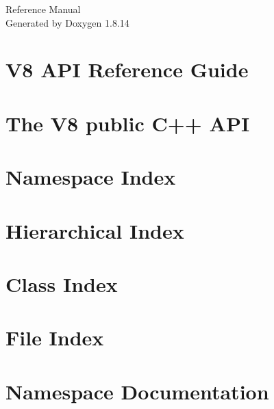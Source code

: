 \documentclass[twoside]{book}
\newcommand{\+}{\discretionary{\mbox{\scriptsize$\hookleftarrow$}}{}{}}
\newcommand{\clearemptydoublepage}{%
  \newpage{\pagestyle{empty}\cleardoublepage}%
}
\begin{document}
\hypersetup{pageanchor=false,
             bookmarksnumbered=true,
             pdfencoding=unicode
            }
\begin{titlepage}
\vspace*{7cm}
\begin{center}%
{\Large Reference Manual}\\
\vspace*{1cm}
{\large Generated by Doxygen 1.8.14}\\
\end{center}
\end{titlepage}
\clearemptydoublepage
{}
\tableofcontents
\clearemptydoublepage
{}
\hypersetup{pageanchor=true}

\chapter{V8 A\+PI Reference Guide}
\label{index}\hypertarget{index}{}
\chapter{The V8 public C++ A\+PI}
\label{md_v8_include_APIDesign}

\chapter{Namespace Index}

\chapter{Hierarchical Index}

\chapter{Class Index}

\chapter{File Index}

\chapter{Namespace Documentation}

\end{document}
